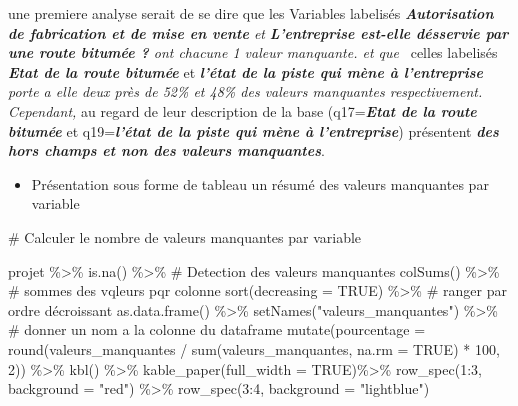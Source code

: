 \documentclass[
  letterpaper,
  DIV=11,
  numbers=noendperiod]{scrartcl}
\newenvironment{Shaded}{\begin{snugshade}}{\end{snugshade}}
\newcommand{\AttributeTok}[1]{\textcolor[rgb]{0.40,0.45,0.13}{#1}}
\newcommand{\CommentTok}[1]{\textcolor[rgb]{0.37,0.37,0.37}{#1}}
\newcommand{\ConstantTok}[1]{\textcolor[rgb]{0.56,0.35,0.01}{#1}}
\newcommand{\DecValTok}[1]{\textcolor[rgb]{0.68,0.00,0.00}{#1}}
\newcommand{\FunctionTok}[1]{\textcolor[rgb]{0.28,0.35,0.67}{#1}}
\newcommand{\NormalTok}[1]{\textcolor[rgb]{0.00,0.23,0.31}{#1}}
\newcommand{\SpecialCharTok}[1]{\textcolor[rgb]{0.37,0.37,0.37}{#1}}
\newcommand{\StringTok}[1]{\textcolor[rgb]{0.13,0.47,0.30}{#1}}
\providecommand{\tightlist}{%
  \setlength{\itemsep}{0pt}\setlength{\parskip}{0pt}}\usepackage{longtable,booktabs,array}
\begin{document}
une premiere analyse serait de se dire que les Variables labelisés
\emph{\textbf{Autorisation de fabrication et de mise en vente} et}
\emph{\textbf{L'entreprise est-elle désservie par une route bitumée ?}
ont chacune 1 valeur manquante. et que} ~celles labelisés
\textbf{\emph{Etat de la route bitumée}} et \emph{\textbf{l'état de la
piste qui mène à l'entreprise} porte a elle deux près de 52\% et 48\%
des valeurs manquantes respectivement.\\
Cependant,} au regard de leur description de la base
(q17=\textbf{\emph{Etat de la route bitumée}} et
q19=\textbf{\emph{l'état de la piste qui mène à l'entreprise}})
présentent \textbf{\emph{des hors champs et non des valeurs
manquantes}}.

\begin{itemize}
\tightlist
\item
  Présentation sous forme de tableau un résumé des valeurs manquantes
  par variable
\end{itemize}

\begin{Shaded}
\begin{Highlighting}[]
\CommentTok{\# Calculer le nombre de valeurs manquantes par variable}

\NormalTok{projet }\SpecialCharTok{\%\textgreater{}\%}
    \FunctionTok{is.na}\NormalTok{() }\SpecialCharTok{\%\textgreater{}\%}                \CommentTok{\# Detection des valeurs manquantes}
      \FunctionTok{colSums}\NormalTok{() }\SpecialCharTok{\%\textgreater{}\%}            \CommentTok{\# sommes des vqleurs pqr colonne}
         \FunctionTok{sort}\NormalTok{(}\AttributeTok{decreasing =} \ConstantTok{TRUE}\NormalTok{) }\SpecialCharTok{\%\textgreater{}\%} \CommentTok{\# ranger par ordre décroissant}
            \FunctionTok{as.data.frame}\NormalTok{() }\SpecialCharTok{\%\textgreater{}\%}
              \FunctionTok{setNames}\NormalTok{(}\StringTok{"valeurs\_manquantes"}\NormalTok{) }\SpecialCharTok{\%\textgreater{}\%}  \CommentTok{\# donner un nom a la colonne du dataframe}
                \FunctionTok{mutate}\NormalTok{(}\AttributeTok{pourcentage =} \FunctionTok{round}\NormalTok{(valeurs\_manquantes }\SpecialCharTok{/} \FunctionTok{sum}\NormalTok{(valeurs\_manquantes, }\AttributeTok{na.rm =} \ConstantTok{TRUE}\NormalTok{) }\SpecialCharTok{*} \DecValTok{100}\NormalTok{, }\DecValTok{2}\NormalTok{)) }\SpecialCharTok{\%\textgreater{}\%}
                  \FunctionTok{kbl}\NormalTok{() }\SpecialCharTok{\%\textgreater{}\%} 
                    \FunctionTok{kable\_paper}\NormalTok{(}\AttributeTok{full\_width =} \ConstantTok{TRUE}\NormalTok{)}\SpecialCharTok{\%\textgreater{}\%}
                      \FunctionTok{row\_spec}\NormalTok{(}\DecValTok{1}\SpecialCharTok{:}\DecValTok{3}\NormalTok{, }\AttributeTok{background =} \StringTok{"red"}\NormalTok{) }\SpecialCharTok{\%\textgreater{}\%} 
                        \FunctionTok{row\_spec}\NormalTok{(}\DecValTok{3}\SpecialCharTok{:}\DecValTok{4}\NormalTok{, }\AttributeTok{background =} \StringTok{"lightblue"}\NormalTok{)}
\end{Highlighting}
\end{Shaded}
\end{document}
